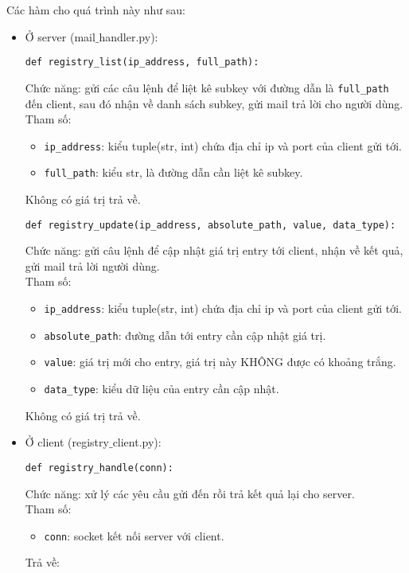 Các hàm cho quá trình này như sau:
\begin{itemize}
\item Ở server (mail$\_$handler.py):\\
\begin{lstlisting}
def registry_list(ip_address, full_path):
\end{lstlisting}
Chức năng: gửi các câu lệnh để liệt kê subkey với đường dẫn là \lstinline{full_path} đến client, sau đó nhận về danh sách subkey, gửi mail trả lời cho người dùng.\\
Tham số: 
\begin{itemize}
\item \lstinline{ip_address}: kiểu tuple(str, int) chứa địa chỉ ip và port của client gửi tới.
\item \lstinline{full_path}: kiểu str, là đường dẫn cần liệt kê subkey.
\end{itemize}
Không có giá trị trả về.

\begin{lstlisting}
def registry_update(ip_address, absolute_path, value, data_type):
\end{lstlisting}
Chức năng: gửi câu lệnh để cập nhật giá trị entry tới client, nhận về kết quả, gửi mail trả lời người dùng.\\
Tham số: 
\begin{itemize}
\item \lstinline{ip_address}: kiểu tuple(str, int) chứa địa chỉ ip và port của client gửi tới.
\item \lstinline{absolute_path}: đường dẫn tới entry cần cập nhật giá trị.
\item \lstinline{value}: giá trị mới cho entry, giá trị này KHÔNG được có khoảng trắng.
\item \lstinline{data_type}: kiểu dữ liệu của entry cần cập nhật.
\end{itemize}
Không có giá trị trả về.


\item Ở client (registry$\_$client.py):
\begin{lstlisting}
def registry_handle(conn):
\end{lstlisting}
Chức năng: xử lý các yêu cầu gửi đến rồi trả kết quả lại cho server.\\
Tham số: 
\begin{itemize}
\item \lstinline{conn}: socket kết nối server với client.
\end{itemize}
Trả về: 


\end{itemize}
